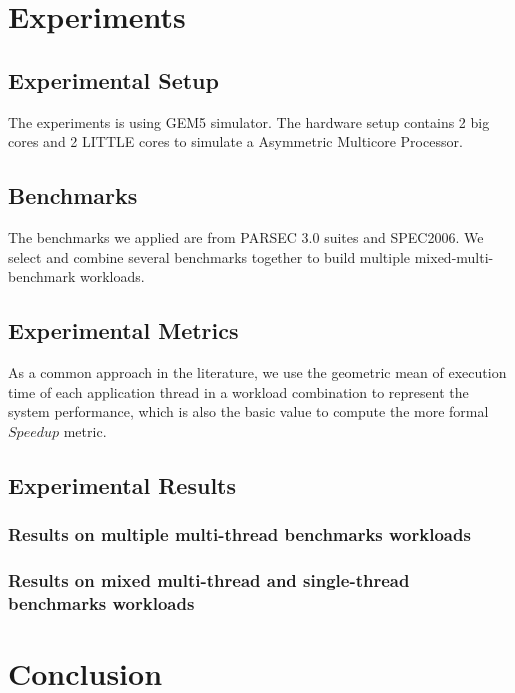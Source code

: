 \documentclass[pageno]{jpaper}
\begin{document}
\section{Experiments}
\label{ep}

\subsection{Experimental Setup}
The experiments is using GEM5 \cite{binkert2011gem5} simulator. The hardware setup contains 2 big cores and 2 LITTLE cores to simulate a Asymmetric Multicore Processor.


\subsection{Benchmarks}
The benchmarks we applied are from PARSEC 3.0\cite{bienia2008parsec} suites and SPEC2006\cite{henning2006spec}. We select and combine several benchmarks together to build multiple mixed-multi-benchmark workloads.

\subsection{Experimental Metrics}
As a common approach in the literature, we use the geometric mean of execution time of each application thread in a workload combination to represent the system performance, which is also the basic value to compute the more formal $Speedup$\cite{joao2013utility} metric.

\subsection{Experimental Results}

\subsubsection{Results on multiple multi-thread benchmarks workloads}

\subsubsection{Results on mixed multi-thread and single-thread benchmarks workloads}

\section{Conclusion}
\end{document}
